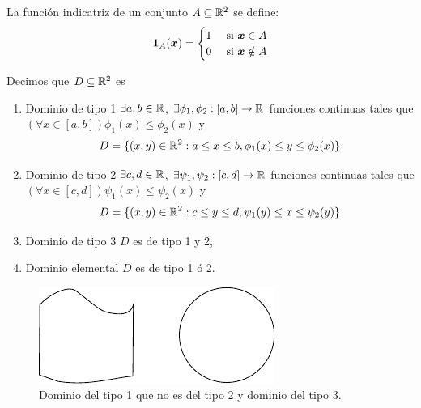 \begin{definicion}
La funci\'on indicatriz de un conjunto $A\subseteq \mathbb{R}^2$ se define:
\[
    \mathbf{1}_{A}(\boldsymbol{x}) = \begin{cases}
        1	 & \text{ si } \boldsymbol{x} \in A \\
        0    & \text{ si } \boldsymbol{x} \notin A
    \end{cases}
\]
\end{definicion}

\begin{definicion}
Decimos que $ D \subseteq \mathbb{R}^2 $ es
\begin{enumerate}
    \item Dominio de tipo 1 \tssi{}
$\exists a,b \in \mathbb{R}$, $\exists \phi_1, \phi_2:[a,b] \to \mathbb{R} $
funciones continuas tales que $ (\forall x \in [a,b])\phi_1(x)
\leq \phi_2(x) $ y
    \[ D = \{(x,y) \in \mathbb{R}^2 : a \leq x \leq b, \phi_1(x)
    \leq y \leq \phi_2(x)\} \]
    \item Dominio de tipo 2 \tssi{} $\exists c,d
\in \mathbb{R}$, $\exists \psi_1, \psi_2:[c,d] \to \mathbb{R} $ funciones
continuas tales que $ (\forall x \in [c,d])\psi_1(x) \leq
\psi_2(x) $ y
    \[ D = \{(x,y) \in \mathbb{R}^2 : c \leq y \leq d, \psi_1(y)
    \leq x \leq \psi_2(y)\} \]
    \item Dominio de tipo 3 \tssi{} $ D $ es de tipo 1 y 2,
    \item Dominio elemental \tssi{} $ D $ es de tipo 1 \'o 2.
\end{enumerate}
\end{definicion}

\begin{figure}[htb]\label{fig:dominioTipo1y3}
	\begin{center}
	\includegraphics[scale=1.0]{figuras/dominioint.pdf}
	\end{center}
	\caption{Dominio del tipo 1 que no es del tipo 2 y dominio del
tipo 3.}
\end{figure}

